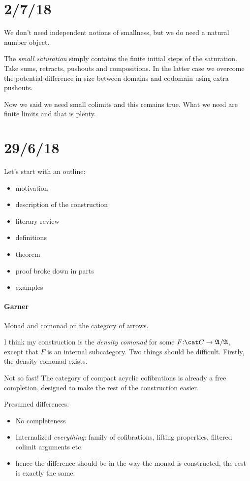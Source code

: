 \documentclass[csh.tex]{subfiles}
\begin{document}
\section{2/7/18}
We don't need independent notions of smallness, but we do need a natural number object.

The \emph{small saturation} simply contains the finite initial steps of the saturation. Take sums, retracts, pushouts and compositions. In the latter case we overcome the potential difference in size between domains and codomain using extra pushouts.

Now we said we need small colimits and this remains true. What we need are finite limits and that is plenty.

\section{29/6/18}
Let's start with an outline:

\begin{itemize}
\item motivation
\item description of the construction
\item literary review
\item definitions
\item theorem
\item proof broke down in parts
\item examples
\end{itemize}


\paragraph{Garner}
Monad and comonad on the category of arrows.

I think my construction is the \emph{density comonad} for some $F\of \cat C \to \ambient/\ambient$, except that $F$ is an internal subcategory.
Two things should be difficult. Firstly, the density comonad exists.

Not so fast! The category of compact acyclic cofibrations is already a free completion, designed to make the rest of the construction easier.







Presumed differences:
\begin{itemize}
\item No completeness
\item Internalized \emph{everything}: family of cofibrations, lifting properties, filtered colimit arguments etc.
\item hence the difference should be in the way the monad is constructed, the rest is exactly the same.
\end{itemize}
\end{document}
